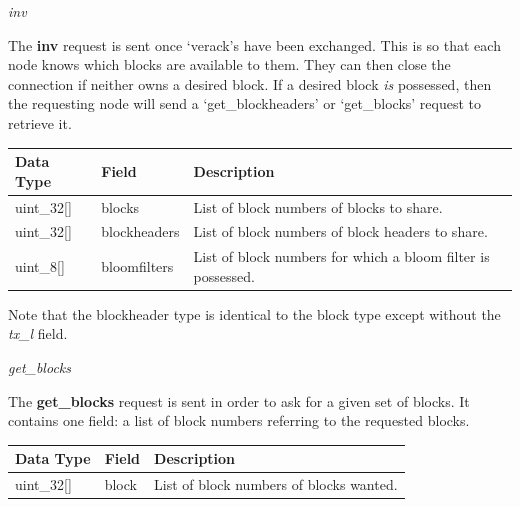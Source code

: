 \documentclass{article}
\begin{document}
\begin{center}
    \Large \textit{inv}
\end{center}
The \textbf{inv} request is sent once `verack's have been exchanged. This is so that each node knows which blocks are available to them. They can then close the connection if neither owns a desired block. If a desired block \textit{is} possessed, then the requesting node will send a `get\_blockheaders' or `get\_blocks' request to retrieve it.
\begin{table}[H]
\centering
\begin{tabular}{|p{2.2cm}|p{3cm}|p{5.5cm}|}
\hline
\rowcolor{tblgrey}
Data Type   & Field       & Description\\ \hline
uint\_32[\hspace{0.05cm}] & blocks & List of block numbers of blocks to share.                    \\ \hline
uint\_32[\hspace{0.05cm}] & blockheaders & List of block numbers of block headers to share.                    \\ \hline
uint\_8[\hspace{0.05cm}]  & bloomfilters & List of block numbers for which a bloom filter is possessed.        \\ \hline
\end{tabular}
\end{table}
Note that the blockheader type is identical to the block type except without the \textit{tx\_l} field.

\begin{center}
    \Large \textit{get\_blocks}
\end{center}
The \textbf{get\_blocks} request is sent in order to ask for a given set of blocks. It contains one field: a list of block numbers referring to the requested blocks.
\begin{table}[H]
\centering
\begin{tabular}{|p{2.2cm}|p{3cm}|p{5.5cm}|}
\hline
\rowcolor{tblgrey}
Data Type   & Field       & Description\\ \hline
uint\_32[\hspace{0.05cm}] & block & List of block numbers of blocks wanted.                    \\ \hline
\end{tabular}
\end{table}
\end{document}
